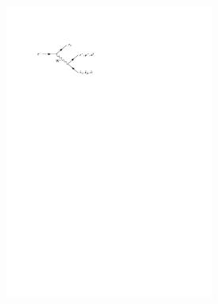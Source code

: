 \begin{figure}[htb]
  \begin{subfigure}[b]{0.47\textwidth}
    \centering

    \includegraphics[width=0.75\textwidth]{figs/tauid/tau_decay_feynman}

    \vspace*{3em}
    \subcaption{}%
    \label{fig:tau_feynman}
  \end{subfigure}\hfill
  \begin{subfigure}[b]{0.47\textwidth}
    \centering


\end{subfigure}
\end{figure}
